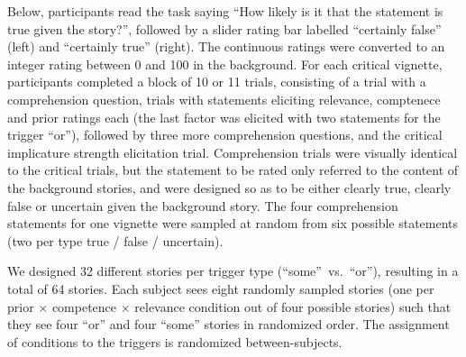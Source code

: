 \documentclass{sp}
\begin{document}
Below, participants read the task saying ``How likely is it that the statement is true given the story?'', followed by a slider rating bar labelled ``certainly false'' (left) and ``certainly true'' (right). The continuous ratings were converted to an integer rating between 0 and 100 in the background. For each critical vignette, participants completed a block of 10 or 11 trials, consisting of a trial with a comprehension question, trials with statements eliciting relevance, comptenece and prior ratings each (the last factor was elicited with two statements for the trigger ``or''), followed by three more comprehension questions, and the critical implicature strength elicitation trial. 
Comprehension trials were visually identical to the critical trials, but the statement to be rated only referred to the content of the background stories, and were designed so as to be either clearly true, clearly false or uncertain given the background story. 
The four comprehension statements for one vignette were sampled at random from six possible statements (two per type true / false / uncertain). 
 
 We designed 32 different stories per trigger type (``some''~vs.~``or''), resulting in a total of 64 stories. Each subject sees eight randomly sampled stories (one per prior $\times$ competence $\times$ relevance condition out of four possible stories) such that they see four ``or'' and four ``some'' stories in randomized order. The assignment of conditions to the triggers is randomized between-subjects.
\end{document}
